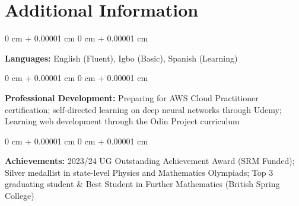 \documentclass[10pt, a4paper]{article}
\newenvironment{onecolentry}{
    \begin{adjustwidth}{
        0 cm + 0.00001 cm
    }{
        0 cm + 0.00001 cm
    }
}{
    \end{adjustwidth}
} %
\begin{document}
    \section{Additional Information}

    \begin{onecolentry}
        \textbf{Languages:} English (Fluent), Igbo (Basic), Spanish (Learning)
    \end{onecolentry}

    \vspace{0.2 cm}

    \begin{onecolentry}
        \textbf{Professional Development:} Preparing for AWS Cloud Practitioner certification; self-directed learning on deep neural networks through Udemy; Learning web development through the Odin Project curriculum
    \end{onecolentry}

    \vspace{0.2 cm}

    \begin{onecolentry}
        \textbf{Achievements:} 2023/24 UG Outstanding Achievement Award (SRM Funded); Silver medallist in state-level Physics and Mathematics Olympiads; Top 3 graduating student \& Best Student in Further Mathematics (British Spring College)
    \end{onecolentry}

    \vspace{0.2 cm}

\end{document}

